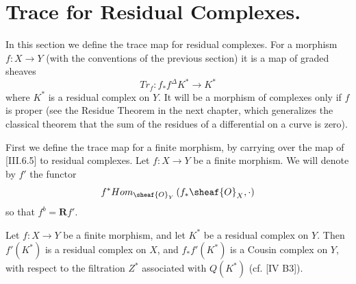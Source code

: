 \documentclass[12pt]{book}
\begin{document}
\setcounter{page}{335}
\section{Trace for Residual Complexes.}

In this section we define the trace map for residual complexes. For a morphism \(f: X \to Y\) (with the conventions of the previous section) it is a map of graded sheaves
\[Tr_{f}: f_{*} f^{\Delta} K^{*} \to K^{*}\]
where \(K^{*}\) is a residual complex on \(Y\). It will be a morphism of complexes only if \(f\) is proper (see the Residue Theorem in the next chapter, which generalizes the classical theorem that the sum of the residues of a differential on a curve is zero).

First we define the trace map for a finite morphism, by carrying over the map of [III.6.5] to residual complexes. Let \(f: X \to Y\) be a finite morphism. We will denote by \(f'\) the functor
\[f^{*} Hom_{\sheaf{O}_{Y}}\left(f_{*} \sheaf{O}_{X}, \cdot\right)\]
so that \(f^{b}=\mathbf{R} f'\).

\setcounter{page}{336}
\begin{lemma}
Let \(f: X \to Y\) be a finite morphism, and let \(K^{*}\) be a residual complex on \(Y\). Then \(f'(K^{*})\) is a residual complex on \(X\), and \(f_{*} f'(K^{*})\) is a Cousin complex
on \(Y\), with respect to the filtration \(Z^{*}\) associated with \(Q(K^{*})\) (cf. [IV B3]).
\end{lemma}
\end{document}
